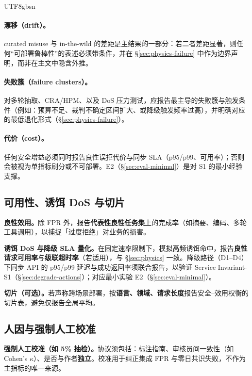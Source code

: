 \documentclass[letterpaper,twocolumn,10pt]{article}
\begin{document}
\begin{CJK}{UTF8}{gbsn}
\paragraph{漂移（drift）。}
curated misuse 与 in-the-wild 的差距是主结果的一部分：若二者差距显著，则任何“可部署鲁棒性”的表述必须带条件，并在 \S\ref{sec:physics-failure} 中作为边界声明，而非在主文中隐含外推。

\paragraph{失败簇（failure clusters）。}
对多轮抽取、CRA/HPM、以及 DoS 压力测试，应报告最主导的失败簇与触发条件（例如：预算不足、裁判不确定区间扩大、或降级触发频率过高），并明确对应的最低退化形式（\S\ref{sec:physics-failure}）。

\paragraph{代价（cost）。}
任何安全增益必须同时报告良性误拒代价与同步 SLA（p95/p99、可用率）；否则会被视为单指标刷分或不可部署。E2（\S\ref{sec:eval-minimal}）是对 S1 的最小经验支撑。

\subsection{可用性、诱饵 DoS 与切片}
\label{sec:eval-utility}

\textbf{良性效用。}除 FPR 外，报告\textbf{代表性良性任务集}上的完成率（如摘要、编码、多轮工具调用），以捕捉「过度拒绝」对业务的损害。

\textbf{诱饵 DoS 与降级 SLA 量化。}在固定速率限制下，模拟高频诱饵命中，报告\textbf{良性请求可用率}与\textbf{级联超时率}（若适用），与 \S\ref{sec:physics} 一致。降级路径（D1--D4）下同步 API 的 p95/p99 延迟与成功返回率须联合报告，以验证 Service Invariant-S1（\S\ref{sec:degrade-actions}）；对应最小实验 E2（\S\ref{sec:eval-minimal}）。

\textbf{切片（可选）。}若声称跨场景部署，按\textbf{语言、领域、请求长度}报告安全--效用权衡的切片表，避免仅报告全局平均。

\subsection{人因与强制人工校准}
\label{sec:eval-human}

\textbf{强制人工校准（如 5\% 抽检）。}协议须包括：标注指南、审核员间一致性（如 Cohen's $\kappa$）、是否与作者\textbf{独立}。校准用于纠正集成 FPR 与零日共识失败，不作为主指标的唯一来源。


\end{CJK}
\end{document}
